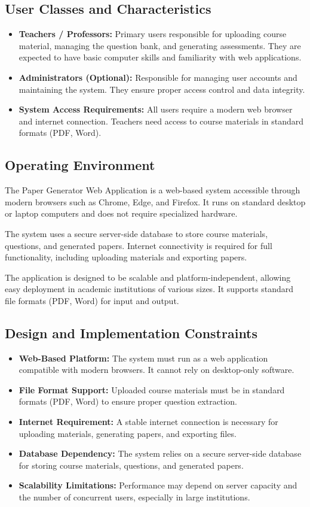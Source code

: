 \documentclass[12pt]{article}
\begin{document}
	\subsection{User Classes and Characteristics}
	\begin{itemize}
		\item \textbf{Teachers / Professors:} Primary users responsible for uploading course material, managing the question bank, and generating assessments. They are expected to have basic computer skills and familiarity with web applications.
		\item \textbf{Administrators (Optional):} Responsible for managing user accounts and maintaining the system. They ensure proper access control and data integrity.
		\item \textbf{System Access Requirements:} All users require a modern web browser and internet connection. Teachers need access to course materials in standard formats (PDF, Word).
	\end{itemize}
	
	\subsection{Operating Environment}
	The Paper Generator Web Application is a web-based system accessible through modern browsers such as Chrome, Edge, and Firefox. It runs on standard desktop or laptop computers and does not require specialized hardware.
	
	The system uses a secure server-side database to store course materials, questions, and generated papers. Internet connectivity is required for full functionality, including uploading materials and exporting papers.
	
	The application is designed to be scalable and platform-independent, allowing easy deployment in academic institutions of various sizes. It supports standard file formats (PDF, Word) for input and output.
	
	\subsection{Design and Implementation Constraints}
	\begin{itemize}
		\item \textbf{Web-Based Platform:} The system must run as a web application compatible with modern browsers. It cannot rely on desktop-only software.
		\item \textbf{File Format Support:} Uploaded course materials must be in standard formats (PDF, Word) to ensure proper question extraction.
		\item \textbf{Internet Requirement:} A stable internet connection is necessary for uploading materials, generating papers, and exporting files.
		\item \textbf{Database Dependency:} The system relies on a secure server-side database for storing course materials, questions, and generated papers.
		\item \textbf{Scalability Limitations:} Performance may depend on server capacity and the number of concurrent users, especially in large institutions.
	\end{itemize}
	
\end{document}
